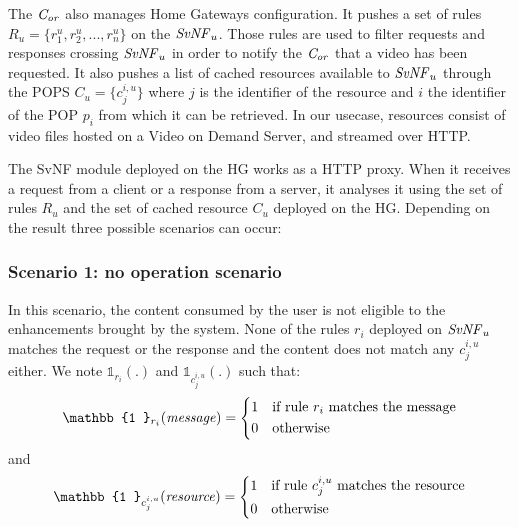 The $\mathit{C_{or}}$ also manages Home Gateways configuration. It pushes a set of rules \(R_{u}=\{r^{u}_{1},r^{u}_{2},...,r^{u}_{n}\}\) on the $\mathit{SvNF}_{u}$. 
Those rules are used to filter requests and responses crossing $\mathit{SvNF}_{u}$ in order to notify the $\mathit{C_{or}}$ that a video has been requested.
It also pushes a list of cached resources available to $\mathit{SvNF}_{u}$ through the POPS $C_{u}=\{c^{i,u}_{j} \}$ where $j$ is the identifier of the resource and $i$ the identifier of the POP $p_{i}$ from which it can be retrieved. In our usecase, resources consist of video files hosted on a Video on Demand Server, and streamed over HTTP.

The SvNF module deployed on the HG works as a HTTP proxy.
When it receives a request from a client or a response from a server, it analyses it using the set of rules \(R_{u}\) and the set of cached resource $C_{u}$ deployed on the HG.
Depending on the result three possible scenarios can occur:


\subsubsection*{Scenario 1: no operation scenario}\label{noop}

In this scenario, the content consumed by the user is not eligible to the enhancements brought by the system. None of the rules $r_{i}$ deployed on $\mathit{SvNF}_{u}$ matches the request or the response and the content does not match any $c^{i,u}_{j}$ either. We note $\mathbb{1}_{r_{i}}(.)$ and $\mathbb{1}_{c^{i,u}_{j}}(.)$ such that:
\[
    \mathbb{1 }_{r_{i}}(\mathit{message})= 
\begin{dcases}
    1& \text{if rule $r_{i}$ matches the message} \\
    0              & \text{otherwise}
\end{dcases}
\]
and 
\[
    \mathbb{1 }_{c^{i,u}_{j}}(\mathit{resource})= 
\begin{dcases}
    1& \text{if rule $c^{i,u}_{j}$ matches the resource} \\
    0              & \text{otherwise}
\end{dcases}
\]

